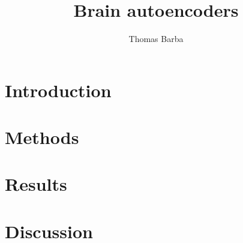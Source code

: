 \documentclass[a4paper]{article}
\author{Thomas Barba}
\title{Brain autoencoders}
\begin{document}
\maketitle

\section{Introduction}

\section{Methods}

\section{Results}

\section{Discussion}
\end{document}

